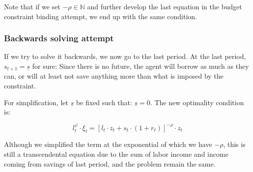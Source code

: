 \documentclass{article}
\begin{document}
Note that if we set $-\rho\in\mathbb{N}$ and further develop the last equation in the 
budget constraint binding attempt, we end up with the same condition.

\subsubsection{Backwards solving attempt}

If we try to solve it backwards, we now go to the last period. 
At the last period, $s_{t+1} = \underline{s}$ for sure:
Since there is no future, 
the agent will borrow as much as they can,
or will at least not save anything more than what is imposed 
by the constraint. 

For simplification, let $\underline{s}$ be fixed such that: $\underline{s} = 0$.
The new optimality condition is: 

\begin{equation}
    l_{t}^{\varphi}\cdot \xi_{t} = \left[l_{t}\cdot z_{t} + s_{t}\cdot(1+r_{t})\right]^{-\rho}\cdot z_{t}
\end{equation}

Although we simplified the term at the exponential of which 
we have $-\rho$, this is still a transcendental equation due to the sum 
of labor income and income coming from savings of last period, 
and the problem remain the same.
\end{document}
